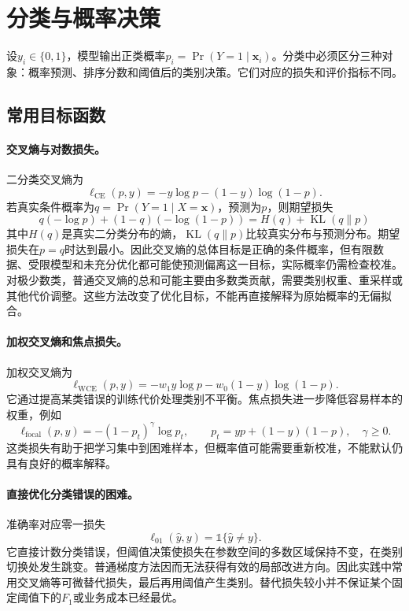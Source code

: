 \section{分类与概率决策}
设$y_i\in\{0,1\}$，模型输出正类概率$p_i=\Pr(Y=1\mid\bm x_i)$。分类中必须区分三种对象：概率预测、排序分数和阈值后的类别决策。它们对应的损失和评价指标不同。

\subsection{常用目标函数}
\paragraph{交叉熵与对数损失。}
二分类交叉熵为
\begin{equation}
 \ell_{\mathrm{CE}}(p,y)=-y\log p-(1-y)\log(1-p).
 \label{eq:classification-cross-entropy}
\end{equation}
若真实条件概率为$q=\Pr(Y=1\mid X=\bm x)$，预测为$p$，则期望损失
\begin{equation}
 q(-\log p)+(1-q)(-\log(1-p))
 =H(q)+\operatorname{KL}(q\|p)
 \label{eq:classification-cross-entropy-kl}
\end{equation}
其中$H(q)$是真实二分类分布的熵，$\operatorname{KL}(q\|p)$比较真实分布与预测分布。期望损失在$p=q$时达到最小。因此交叉熵的总体目标是正确的条件概率，但有限数据、受限模型和未充分优化都可能使预测偏离这一目标，实际概率仍需检查校准。对极少数类，普通交叉熵的总和可能主要由多数类贡献，需要类别权重、重采样或其他代价调整。这些方法改变了优化目标，不能再直接解释为原始概率的无偏拟合。

\paragraph{加权交叉熵和焦点损失。}
加权交叉熵为
\begin{equation}
 \ell_{\mathrm{WCE}}(p,y)=-w_1y\log p-w_0(1-y)\log(1-p).
 \label{eq:classification-weighted-ce}
\end{equation}
它通过提高某类错误的训练代价处理类别不平衡。焦点损失进一步降低容易样本的权重，例如
\begin{equation}
 \ell_{\mathrm{focal}}(p,y)=-(1-p_t)^\gamma\log p_t,
 \qquad p_t=yp+(1-y)(1-p),\quad\gamma\geq0.
 \label{eq:classification-focal}
\end{equation}
这类损失有助于把学习集中到困难样本，但概率值可能需要重新校准，不能默认仍具有良好的概率解释。

\paragraph{直接优化分类错误的困难。}
准确率对应零一损失
\begin{equation}
 \ell_{01}(\hat y,y)=\mathbb{1}\{\hat y\neq y\}.
 \end{equation}
它直接计数分类错误，但阈值决策使损失在参数空间的多数区域保持不变，在类别切换处发生跳变。普通梯度方法因而无法获得有效的局部改进方向。因此实践中常用交叉熵等可微替代损失，最后再用阈值产生类别。替代损失较小并不保证某个固定阈值下的$F_1$或业务成本已经最优。

